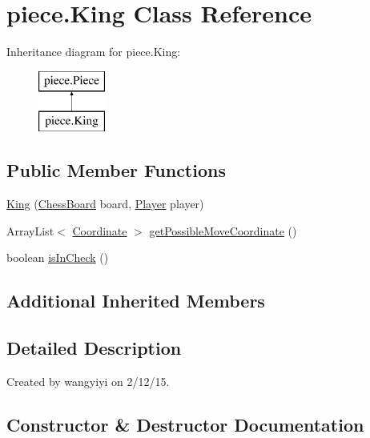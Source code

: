 \hypertarget{classpiece_1_1_king}{}\section{piece.\+King Class Reference}
\label{classpiece_1_1_king}
Inheritance diagram for piece.\+King\+:\begin{figure}[H]
\begin{center}
\leavevmode
\includegraphics[height=2.000000cm]{classpiece_1_1_king}
\end{center}
\end{figure}
\subsection*{Public Member Functions}
\begin{DoxyCompactItemize}
\item 
\hyperlink{classpiece_1_1_king_a8d0f35dc55155899732ded91c9e515a1}{King} (\hyperlink{classchess_1_1_chess_board}{Chess\+Board} board, \hyperlink{enumchess_1_1_player}{Player} player)
\item 
Array\+List$<$ \hyperlink{classpiece_1_1_coordinate}{Coordinate} $>$ \hyperlink{classpiece_1_1_king_a4b21f711fd2e4ac41b4bef0855652e95}{get\+Possible\+Move\+Coordinate} ()
\item 
boolean \hyperlink{classpiece_1_1_king_a1f07ebf057c6ae0c607c83b58f2e12c6}{is\+In\+Check} ()
\end{DoxyCompactItemize}
\subsection*{Additional Inherited Members}


\subsection{Detailed Description}
Created by wangyiyi on 2/12/15. 

\subsection{Constructor \& Destructor Documentation}
\hypertarget{classpiece_1_1_king_a8d0f35dc55155899732ded91c9e515a1}{}
